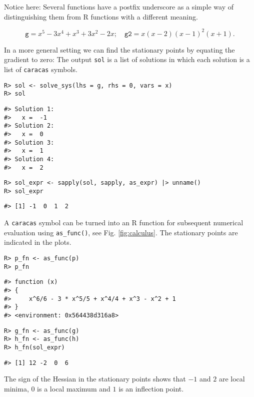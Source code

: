 Notice here: Several functions have a postfix underscore as a simple
way of distinguishing them from R functions with a different
meaning.

\[
 \texttt{g}  = x^{5} - 3 x^{4} + x^{3} + 3 x^{2} - 2 x; \quad 
 \texttt{g2}  = x \left(x - 2\right) \left(x - 1\right)^{2} \left(x + 1\right).
\]

In a more general setting we can find the stationary points by equating the gradient to zero:
The output \texttt{sol} is a list of solutions in which each solution is a list of \texttt{caracas} symbols.

\begin{verbatim}
R> sol <- solve_sys(lhs = g, rhs = 0, vars = x)
R> sol
\end{verbatim}

\begin{verbatim}
#> Solution 1:
#>   x =  -1 
#> Solution 2:
#>   x =  0 
#> Solution 3:
#>   x =  1 
#> Solution 4:
#>   x =  2
\end{verbatim}

\begin{verbatim}
R> sol_expr <- sapply(sol, sapply, as_expr) |> unname()
R> sol_expr
\end{verbatim}

\begin{verbatim}
#> [1] -1  0  1  2
\end{verbatim}

A \texttt{caracas} symbol can be turned into an R function for subsequent
numerical evaluation using \texttt{as\_func()}, see
Fig. \ref{fig:calculus}.
The stationary points are indicated in the plots.

\begin{verbatim}
R> p_fn <- as_func(p)
R> p_fn
\end{verbatim}

\begin{verbatim}
#> function (x) 
#> {
#>     x^6/6 - 3 * x^5/5 + x^4/4 + x^3 - x^2 + 1
#> }
#> <environment: 0x564438d316a8>
\end{verbatim}

\begin{verbatim}
R> g_fn <- as_func(g)
R> h_fn <- as_func(h)
R> h_fn(sol_expr)
\end{verbatim}

\begin{verbatim}
#> [1] 12 -2  0  6
\end{verbatim}

The sign of the Hessian in the stationary points shows that \(-1\) and
\(2\) are local minima, \(0\) is a local maximum and \(1\) is an inflection
point.

